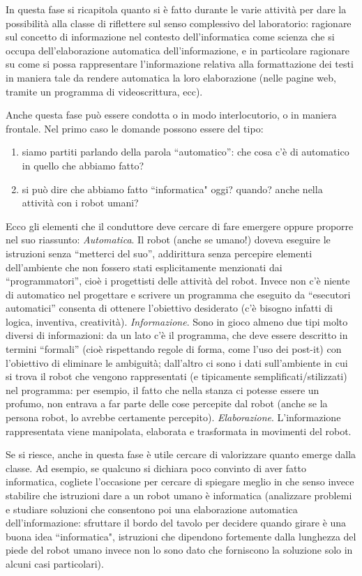 \documentclass[12pt]{article}
\begin{document}
In questa fase si ricapitola quanto si è fatto durante le varie attività per dare la possibilità alla classe di riflettere sul senso complessivo del laboratorio: ragionare sul concetto di informazione nel contesto dell’informatica come scienza che si occupa dell’elaborazione automatica dell’informazione, e in particolare ragionare su come si possa rappresentare l’informazione relativa alla formattazione dei testi in maniera tale da rendere automatica la loro elaborazione (nelle pagine web, tramite un programma di videoscrittura, ecc).

Anche questa fase può essere condotta o in modo interlocutorio, o in maniera frontale. Nel primo caso le domande possono essere del tipo:
\begin{enumerate}
\item siamo partiti parlando della parola ``automatico'': che cosa c’è di automatico in quello che abbiamo fatto?
\item si può dire che abbiamo fatto ``informatica" oggi? quando? anche nella attività con i robot umani?
\end{enumerate}

Ecco gli elementi che il conduttore deve cercare di fare emergere oppure proporre nel suo riassunto:
\textit{Automatica}. Il robot (anche se umano!) doveva eseguire le istruzioni senza ``metterci del suo'', addirittura senza percepire elementi dell’ambiente che non fossero stati esplicitamente menzionati dai ``programmatori'', cioè i progettisti delle attività del robot. Invece non c'è niente di automatico nel progettare e scrivere un programma che eseguito da ``esecutori automatici'' consenta di ottenere l’obiettivo desiderato (c'è bisogno infatti di logica, inventiva, creatività).
\textit{Informazione}. Sono in gioco almeno due tipi molto diversi di informazioni: da un lato c'è il programma, che deve essere descritto in termini ``formali'' (cioè rispettando regole di forma, come l’uso dei post-it) con l'obiettivo di eliminare le ambiguità; dall’altro ci sono i dati sull’ambiente in cui si trova il robot che vengono rappresentati (e tipicamente semplificati/stilizzati) nel programma: per esempio, il fatto che nella stanza ci potesse essere un profumo, non entrava a far parte delle cose percepite dal robot (anche se la persona robot, lo avrebbe certamente percepito).
\textit{Elaborazione}. L’informazione rappresentata viene manipolata, elaborata e trasformata in movimenti del robot.

Se si riesce, anche in questa fase è utile cercare di valorizzare quanto emerge dalla classe. Ad esempio, se qualcuno si dichiara poco convinto di aver fatto informatica, cogliete l’occasione per cercare di spiegare meglio in che senso invece stabilire che istruzioni dare a un robot umano è informatica (analizzare problemi e studiare soluzioni che consentono poi una elaborazione automatica dell’informazione: sfruttare il bordo del tavolo per decidere quando girare è una buona idea ``informatica", istruzioni che dipendono fortemente dalla lunghezza del piede del robot umano invece non lo sono dato che forniscono la soluzione solo in alcuni casi particolari).
\end{document}
